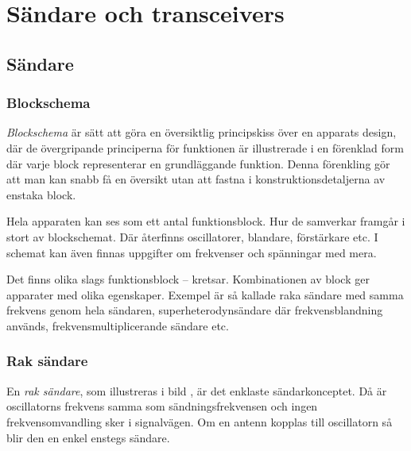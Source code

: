 \chapter[Sändare]{Sändare och transceivers}

\section{Sändare}
\label{sändare}

\subsection{Blockschema}
\label{sändare_blockschema}

\emph{Blockschema} är sätt att göra en översiktlig principskiss över en
apparats design, där de övergripande principerna för funktionen är illustrerade
i en förenklad form där varje block representerar en grundläggande funktion.
Denna förenkling gör att man kan snabb få en översikt utan att fastna i
konstruktionsdetaljerna av enstaka block.

Hela apparaten kan ses som ett antal funktionsblock.
Hur de samverkar framgår i stort av blockschemat.
Där återfinns oscillatorer, blandare, förstärkare etc.
I schemat kan även finnas uppgifter om frekvenser och spänningar med mera.

Det finns olika slags funktionsblock -- kretsar.
Kombinationen av block ger apparater med olika egenskaper.
Exempel är så kallade raka sändare med samma frekvens genom hela sändaren,
superheterodynsändare där frekvensblandning används,
frekvensmultiplicerande sändare etc.



\subsection{Rak sändare}

En \emph{rak sändare}, som illustreras i bild , är det
enklaste sändarkonceptet.
Då är oscillatorns frekvens samma som sändningsfrekvensen och ingen
frekvensomvandling sker i signalvägen.
Om en antenn kopplas till oscillatorn så blir den en enkel enstegs sändare.

